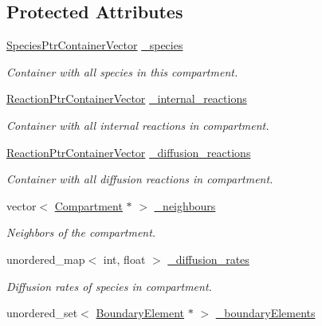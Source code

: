 \subsection*{Protected Attributes}
\begin{DoxyCompactItemize}
\item 
\hyperlink{classSpeciesPtrContainerVector}{Species\+Ptr\+Container\+Vector} \hyperlink{classCompartment_a95e7acd5a3b639050b25fb3b84a96689}{\+\_\+species}
\begin{DoxyCompactList}\small\item\em Container with all species in this compartment. \end{DoxyCompactList}\item 
\hyperlink{classReactionPtrContainerVector}{Reaction\+Ptr\+Container\+Vector} \hyperlink{classCompartment_a76ec81e3474bacae837cce0081a03039}{\+\_\+internal\+\_\+reactions}
\begin{DoxyCompactList}\small\item\em Container with all internal reactions in compartment. \end{DoxyCompactList}\item 
\hyperlink{classReactionPtrContainerVector}{Reaction\+Ptr\+Container\+Vector} \hyperlink{classCompartment_a65651faf3e83b092235afdba261cf820}{\+\_\+diffusion\+\_\+reactions}
\begin{DoxyCompactList}\small\item\em Container with all diffusion reactions in compartment. \end{DoxyCompactList}\item 
vector$<$ \hyperlink{classCompartment}{Compartment} $\ast$ $>$ \hyperlink{classCompartment_aef4d7ce0676c4ddb03fa02b90973c41c}{\+\_\+neighbours}
\begin{DoxyCompactList}\small\item\em Neighbors of the compartment. \end{DoxyCompactList}\item 
unordered\+\_\+map$<$ int, float $>$ \hyperlink{classCompartment_a92081814841d9bacca088eb55381f89c}{\+\_\+diffusion\+\_\+rates}
\begin{DoxyCompactList}\small\item\em Diffusion rates of species in compartment. \end{DoxyCompactList}\item 
unordered\+\_\+set$<$ \hyperlink{classBoundaryElement}{Boundary\+Element} $\ast$ $>$ \hyperlink{classCompartment_aa582b3db6d4bef92ec7c7b7e639d0a09}{\+\_\+boundary\+Elements}

\end{DoxyCompactItemize}
